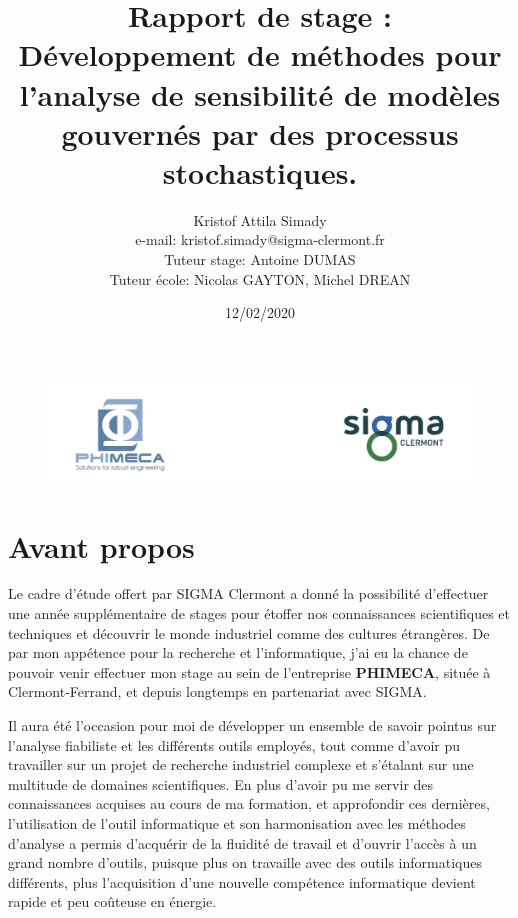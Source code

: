 \documentclass[a4paper,10pt]{article}
\begin{document}
%  
	
   \title{Rapport de stage : \\ 
   Développement de méthodes pour l'analyse de sensibilité de modèles gouvernés par des processus stochastiques.}

   \author{Kristof Attila Simady \\ e-mail: kristof.simady@sigma-clermont.fr \\[1cm]
   			{\small Tuteur stage: Antoine DUMAS}\\[0.5cm]
   			{\small Tuteur école: Nicolas GAYTON, Michel DREAN}}
          
   \date{12/02/2020}

   \maketitle
   
   \begin{figure}[!b]
   \centering \noindent \hspace{-4.5cm}
   \includegraphics[width= \paperwidth]{header_sigma.png}
      \caption*{}
         \label{header_sigma}
   \end{figure} 
  
  \newpage   
   
   \tableofcontents
 
  \newpage
    
\section*{Avant propos}

Le cadre d'étude offert par SIGMA Clermont a donné la possibilité d’effectuer une année supplémentaire de stages pour étoffer nos connaissances scientifiques et techniques  et découvrir le monde industriel comme des cultures étrangères.
De par mon appétence pour la recherche et l'informatique, j'ai eu la chance de pouvoir venir effectuer mon stage au sein de l'entreprise \textbf{PHIMECA}, située à Clermont-Ferrand, et depuis longtemps en partenariat avec SIGMA. \bigskip

Il aura été l'occasion pour moi de développer un ensemble de savoir pointus sur l'analyse fiabiliste et les différents outils employés, tout comme d'avoir pu travailler sur un projet de recherche industriel complexe et s'étalant sur une multitude de domaines scientifiques. En plus d'avoir pu me servir des connaissances acquises au cours de ma formation, et approfondir ces dernières, l'utilisation de l'outil informatique et son harmonisation avec les méthodes d'analyse a permis d'acquérir de la fluidité de travail et d'ouvrir l'accès à un grand nombre d'outils, puisque plus on travaille avec des outils informatiques différents, plus l'acquisition d'une nouvelle compétence informatique devient rapide et peu coûteuse en énergie. \par \bigskip
\end{document}
